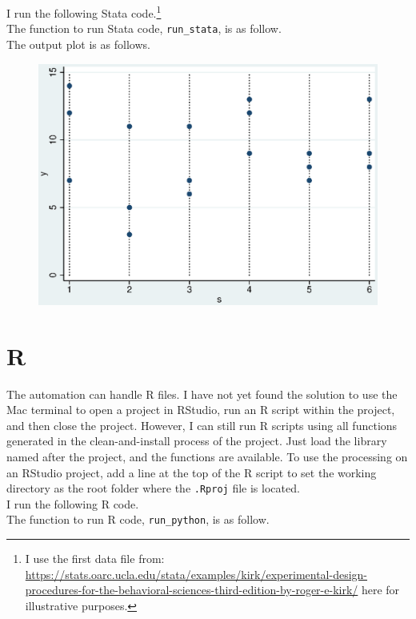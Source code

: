 \documentclass[12pt, a4paper]{article}
\begin{document}
I run the following Stata code.\footnote{I use the first data file from: \url{https://stats.oarc.ucla.edu/stata/examples/kirk/experimental-design-procedures-for-the-behavioral-sciences-third-edition-by-roger-e-kirk/} here for illustrative purposes.}\\



The function to run Stata code, \texttt{run\_stata}, is as follow.\\



The output plot is as follows.\\

\begin{figure}[H]
	\includegraphics[width=.5\textwidth]{sample_stata_graph}
\end{figure}

\section{R}

The automation can handle R files. I have not yet found the solution to use the Mac terminal to open a project in RStudio, run an R script within the project, and then close the project. However, I can still run R scripts using all functions generated in the clean-and-install process of the project. Just load the library named after the project, and the functions are available. To use the processing on an RStudio project, add a line at the top of the R script to set the working directory as the root folder where the \texttt{.Rproj} file is located.\\

I run the following R code.\\



The function to run R code, \texttt{run\_python}, is as follow.\\
\end{document}
